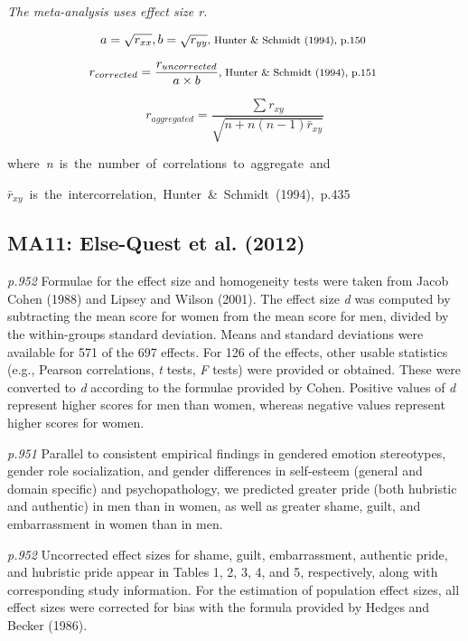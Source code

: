 \documentclass{article}
\begin{document}
\vspace{3mm}
\textit{The meta-analysis uses effect size r.}

\begin{equation*}
a = \sqrt{r_{xx}}, b = \sqrt{r_{yy}} \mbox{\footnotesize, Hunter \& Schmidt (1994), p.150 } 
\end{equation*}

\begin{equation*}
r_{corrected} =\frac{ r_{uncorrected}}{a \times b} \mbox{\footnotesize, Hunter \& Schmidt (1994), p.151 } 
\end{equation*}

\begin{equation*}
r_{aggregated}=\frac{\sum r_{xy}}{\sqrt{n+n(n-1)\bar{r}_{xy}}} 
\end{equation*}

\mbox{\footnotesize where \textit{n} is the number of correlations to aggregate and }

\mbox{\footnotesize $\bar{r}_{xy}$ is the intercorrelation, Hunter \& Schmidt (1994), p.435 }


\subsection*{MA11: Else-Quest et al. (2012)}

\textit{p.952} Formulae for the effect size and homogeneity tests were taken from Jacob Cohen (1988) and Lipsey and Wilson (2001). The effect size \textit{d} was computed by subtracting the mean score for women from the mean score for men, divided by the within-groups standard deviation. Means and standard deviations were available for 571 of the 697 effects. For 126 of the effects, other usable statistics (e.g., Pearson correlations, \textit{t} tests, \textit{F} tests) were provided or obtained. These were converted to \textit{d} according to the formulae provided by Cohen. Positive values of \textit{d} represent higher scores for men than women, whereas negative values represent higher scores for women.

\textit{p.951} Parallel to consistent empirical findings in gendered emotion stereotypes, gender role socialization, and gender differences in self-esteem (general and domain specific) and psychopathology, we predicted greater pride (both hubristic and authentic) in men than in women, as well as greater shame, guilt, and embarrassment in women than in men.  

\textit{p.952} Uncorrected effect sizes for shame, guilt, embarrassment, authentic pride, and hubristic pride appear in Tables 1, 2, 3, 4, and 5, respectively, along with corresponding study information. For the estimation of population effect sizes, all effect sizes were corrected for bias with the formula provided by Hedges and Becker (1986).
\end{document}
